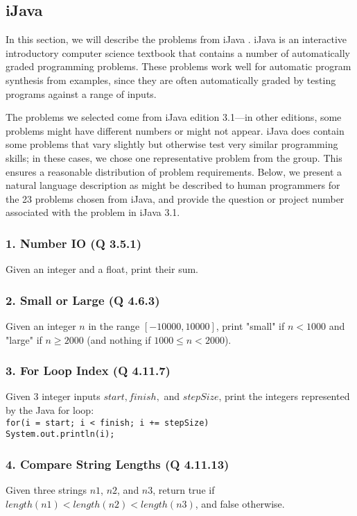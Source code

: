 \documentclass{sig-alternate}
\begin{document}
\subsection{iJava}

In this section, we will describe the problems from iJava \cite{iJava, Moll:2011:IOI:1968521.1968535}. iJava is an interactive introductory computer science textbook that contains a number of automatically graded programming problems. These problems work well for automatic program synthesis from examples, since they are often automatically graded by testing programs against a range of inputs. 

The problems we selected come from iJava edition 3.1---in other editions, some problems might have different numbers or might not appear. iJava does contain some problems that vary slightly but otherwise test very similar programming skills; in these cases, we chose one representative problem from the group. This ensures a reasonable distribution of problem requirements. Below, we present a natural language description as might be described to human programmers for the 23 problems chosen from iJava, and provide the question or project number associated with the problem in iJava 3.1.

\subsubsection*{1. Number IO (Q 3.5.1)}
Given an integer and a float, print their sum.

\subsubsection*{2. Small or Large (Q 4.6.3)}
Given an integer $n$ in the range $[-10000, 10000]$, print "small" if $n < 1000$ and "large" if $n \ge 2000$ (and nothing if $1000 \le n < 2000$).

\subsubsection*{3. For Loop Index (Q 4.11.7)}
Given 3 integer inputs $start, finish,$ and $stepSize$, print the integers represented by the Java for loop: \\
\texttt{for(i = start; i < finish; i += stepSize) \\ \- \- \- \- System.out.println(i);}

\subsubsection*{4. Compare String Lengths (Q 4.11.13)}
Given three strings $n1$, $n2$, and $n3$, return true if $length(n1) < length(n2) < length(n3)$, and false otherwise.
\end{document}
